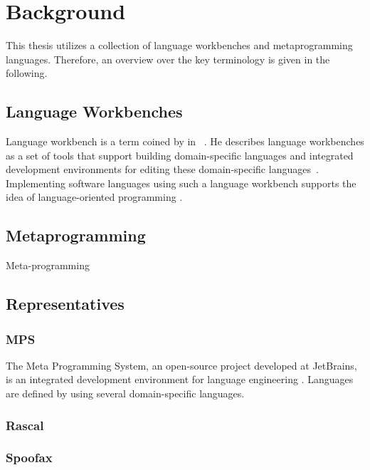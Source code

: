 \chapter{Background}

This thesis utilizes a collection of language workbenches and metaprogramming languages. 
Therefore, an overview over the key terminology is given in the following.

\label{c:background}

\section{Language Workbenches}

Language workbench is a term coined by \citeauthor{fowler2005language} in \citeyear{fowler2005language}~\cite{fowler2005language}.
He describes language workbenches as a set of tools that support building domain-specific languages and integrated development environments for editing these domain-specific languages~\cite{fowler2010domain}.
Implementing software languages using such a language workbench supports the idea of language-oriented programming \cite{dmitriev2004language} \cite{fowler2005language}.

\section{Metaprogramming}

Meta-programming 

\section{Representatives}

\label{c:background/representatives}

\subsection{MPS}

The Meta Programming System, an open-source project developed at JetBrains, is an integrated development environment for language engineering \cite{pech2013jetbrains}.
Languages are defined by using several domain-specific languages.

\subsection{Rascal}

\subsection{Spoofax}

